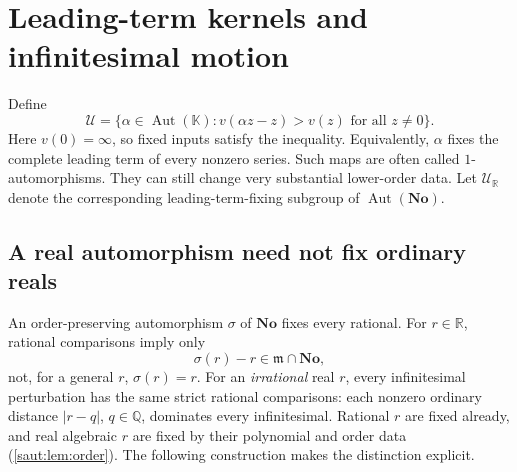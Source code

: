 \documentclass[11pt]{article}
\theoremstyle{definition}
\theoremstyle{remark}
\newcommand{\No}{\mathbf{No}}
\newcommand{\R}{\mathbb R}
\newcommand{\Q}{\mathbb Q}
\newcommand{\K}{\mathbb K}
\newcommand{\mm}{\mathfrak m}
\newcommand{\U}{\mathcal U}
\newcommand{\Aut}{\operatorname{Aut}}
\numberwithin{equation}{section}
\begin{document}
\section{Leading-term kernels and infinitesimal motion}\label{saut:sec:kernels}

Define
\begin{equation}\label{saut:eq:U}
 \U=\{\alpha\in\Aut(\K):
       v(\alpha z-z)>v(z)\text{ for all }z\ne0\}.
\end{equation}
Here $v(0)=\infty$, so fixed inputs satisfy the inequality. Equivalently,
$\alpha$ fixes the complete leading term of every nonzero series.
Such maps are often called $1$-automorphisms. They can still change very
substantial lower-order data. Let $\U_{\R}$ denote the corresponding
leading-term-fixing subgroup of $\Aut(\No)$.

\subsection{A real automorphism need not fix ordinary reals}

An order-preserving automorphism $\sigma$ of $\No$ fixes every rational.
For $r\in\R$, rational comparisons imply only
\[
 \sigma(r)-r\in\mm\cap\No,
\]
not, for a general $r$, $\sigma(r)=r$. For an \emph{irrational} real $r$,
every infinitesimal perturbation has the same strict rational comparisons:
each nonzero ordinary distance $|r-q|$, $q\in\Q$, dominates every
infinitesimal. Rational $r$ are fixed already, and real algebraic $r$ are
fixed by their polynomial and order data (\cref{saut:lem:order}).
The following construction makes the distinction explicit.
\end{document}
